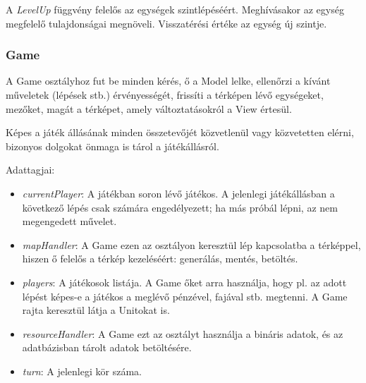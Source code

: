\documentclass[a4paper,12pt]{report}
\begin{document}
A \textit{LevelUp} függvény felelős az egységek szintlépéséért. Meghívásakor az egység megfelelő tulajdonságai megnöveli. Visszatérési értéke az egység új szintje.

\subsubsection{Game}
A Game osztályhoz fut be minden kérés, ő a Model lelke, ellenőrzi a kívánt műveletek (lépések stb.) érvényességét, frissíti a térképen lévő egységeket, mezőket, magát a térképet, amely változtatásokról a View értesül.

Képes a játék állásának minden összetevőjét közvetlenül vagy közvetetten elérni, bizonyos dolgokat önmaga is tárol a játékállásról.

Adattagjai:
\begin{itemize}
\item \textit{currentPlayer}: A játékban soron lévő játékos. A jelenlegi játékállásban a következő lépés csak számára engedélyezett; ha más próbál lépni, az nem megengedett művelet.
\item \textit{mapHandler}: A Game ezen az osztályon keresztül lép kapcsolatba a térképpel, hiszen ő felelős a térkép kezeléséért: generálás, mentés, betöltés.
\item \textit{players}: A játékosok listája. A Game őket arra használja, hogy pl. az adott lépést képes-e a játékos a meglévő pénzével, fajával stb. megtenni. A Game rajta keresztül látja a Unitokat is.
\item \textit{resourceHandler}: A Game ezt az osztályt használja a bináris adatok, és az adatbázisban tárolt adatok betöltésére.
\item \textit{turn}: A jelenlegi kör száma.
\end{itemize}
\end{document}
